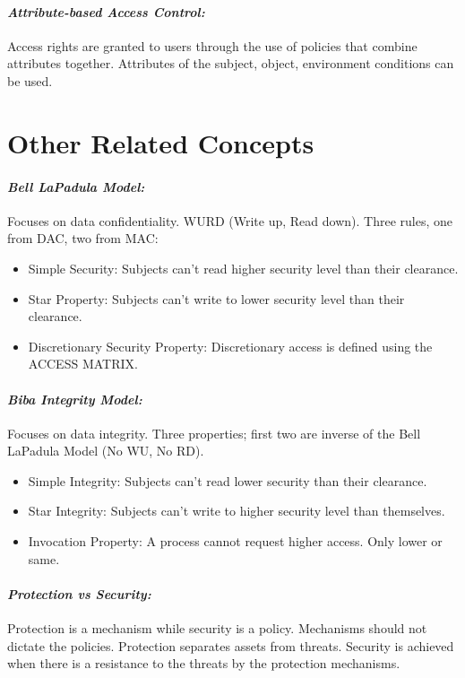 \documentclass[11pt]{article} %
\begin{document}
\paragraph{\textit{Attribute-based Access Control:}} Access rights are granted to users through the use of policies that combine attributes together. Attributes of the subject, object, environment conditions can be used.

\section{Other Related Concepts}

\paragraph{\textit{Bell LaPadula Model:}} Focuses on data confidentiality. WURD (Write up, Read down). Three rules, one from DAC, two from MAC:

\begin{itemize}
\item Simple Security: Subjects can't read higher security level than their clearance.
\item Star Property: Subjects can't write to lower security level than their clearance.
\item Discretionary Security Property: Discretionary access is defined using the ACCESS MATRIX.
\end{itemize}

\paragraph{\textit{Biba Integrity Model:}} Focuses on data integrity. Three properties; first two are inverse of the Bell LaPadula Model (No WU, No RD).

\begin{itemize}
\item Simple Integrity: Subjects can't read lower security than their clearance.
\item Star Integrity: Subjects can't write to higher security level than themselves.
\item Invocation Property: A process cannot request higher access. Only lower or same.
\end{itemize}

\paragraph{\textit{Protection vs Security:}} Protection is a mechanism while security is a policy. Mechanisms should not dictate the policies. Protection separates assets from threats. Security is achieved when there is a resistance to the threats by the protection mechanisms.
\end{document}
